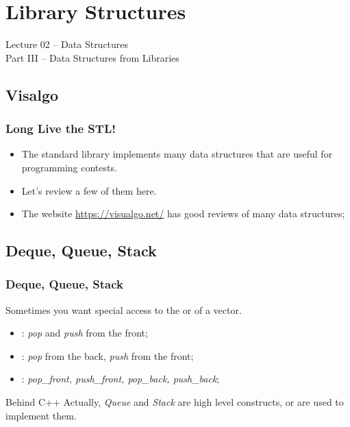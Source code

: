 \section{Library Structures}
\begin{frame}
  \begin{center}
    {\large Lecture 02 -- Data Structures\\Part III -- Data Structures from Libraries}\\
  \end{center}
\end{frame}

\subsection{Visalgo}
\begin{frame}
  \frametitle{Long Live the STL!}

  \begin{itemize}
    \item The standard library implements many data structures that are
      useful for programming contests.
      \bigskip

    \item Let's review a few of them here.
      \bigskip

    \item The website \url{https://visualgo.net/} has good reviews of many
     data structures;
  \end{itemize}

\end{frame}

\subsection{Deque, Queue, Stack}

\begin{frame}
  \frametitle{Deque, Queue, Stack}

  Sometimes you want special access to the  or 
  of a vector.

  \bigskip

  \begin{itemize}
    \item {}: \emph{pop} and \emph{push} from the front;
    \bigskip

    \item {}: \emph{pop} from the back, \emph{push} from the front;
    \bigskip

    \item {}: \emph{pop\_front, push\_front, pop\_back, push\_back};
  \end{itemize}
  \bigskip

  \begin{block}{Behind C++}
    Actually, \emph{Queue} and \emph{Stack} are high level constructs,
     or  are used to implement them.
  \end{block}
\end{frame}

